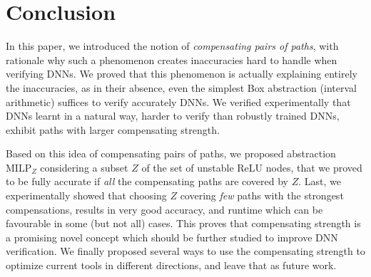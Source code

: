 \documentclass{llncs}
\newcommand{\MILP}{{\textrm{MILP}}}
\begin{document}



\vspace{-0.2cm}
\section{Conclusion}
\vspace{-0.2cm}

In this paper, we introduced the notion of {\em compensating pairs of paths}, with rationale why such a phenomenon creates inaccuracies hard to handle when verifying DNNs. We proved that this phenomenon is actually explaining entirely the inaccuracies, as in their absence, even the simplest Box abstraction (interval arithmetic) suffices to verify accurately DNNs. We verified experimentally that DNNs learnt in a natural way, harder to verify than robustly trained DNNs, exhibit paths with larger compensating strength. 

Based on this idea of compensating pairs of paths, we proposed abstraction $\MILP_{Z}$ considering a subset $Z$ of the set of unstable ReLU nodes, that we proved to be fully accurate if {\em all} the compensating paths are covered by $Z$. Last, we experimentally showed that choosing $Z$ covering {\em few} paths with the strongest compensations, results in very good accuracy, and runtime which can be favourable in some (but not all) cases. This proves that compensating strength is a promising novel concept which should be further studied to improve DNN verification. We finally proposed several ways to use the compensating strength to optimize current tools in different directions, and leave that as future work.

\newpage




\newpage

\appendix


\end{document}
